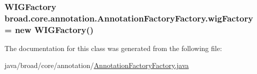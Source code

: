 \hypertarget{classbroad_1_1core_1_1annotation_1_1_annotation_factory_factory_a638bc90b36aae25cf1d4dcad254cfcbe}{
\subsubsection[{wig\+Factory}]{\setlength{\rightskip}{0pt plus 5cm}W\+I\+G\+Factory broad.\+core.\+annotation.\+Annotation\+Factory\+Factory.\+wig\+Factory = new W\+I\+G\+Factory()\hspace{0.3cm}{\ttfamily [static]}}}\label{classbroad_1_1core_1_1annotation_1_1_annotation_factory_factory_a638bc90b36aae25cf1d4dcad254cfcbe}


The documentation for this class was generated from the following file\+:\begin{DoxyCompactItemize}
\item 
java/broad/core/annotation/\hyperlink{_annotation_factory_factory_8java}{Annotation\+Factory\+Factory.\+java}\end{DoxyCompactItemize}
